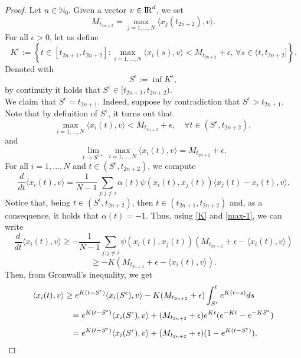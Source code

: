 \documentclass[a4paper,11pt,oneside]{article}
\newcommand{\RR}{{{\rm I} \kern -.15em {\rm R} }}
\begin{document}
	\begin{proof}
		Let $n\in \mathbb{N}_{0}$. Given a vector $v\in \RR^{d}$, we set $$M_{t_{2n+2}}=\max_{j=1,\dots,N}\langle x_{j}(t_{2n+2}),v\rangle.$$
		For all $\epsilon >0$, let us define
		$$K^{\epsilon}:=\left\{t\in [t_{2n+1},t_{2n+2}] :\max_{i=1,\dots,N}\langle x_{i}(s),v\rangle < M_{t_{2n+2}}+\epsilon,\,\forall s\in (t,t_{2n+2}]\right\}.$$
		Denoted with $$S^{\epsilon}:=\inf K^{\epsilon},$$
		by continuity it holds that $S^{\epsilon}\in [t_{2n+1},t_{2n+2})$. \\We claim that $S^{\epsilon}=t_{2n+1}$. Indeed, suppose by contradiction that $S^{\epsilon}>t_{2n+1}$. Note that by definition of $S^{\epsilon}$, it turns out that \begin{equation}\label{max-1}
			\max_{i=1,\dots,N}\langle x_{i}(t),v\rangle<M_{t_{2n+2}}+\epsilon,\quad \forall t\in (S^{\epsilon},t_{2n+2}),
		\end{equation}
		and \begin{equation}\label{teps-1}
			\lim_{t\to S^{\epsilon+}}\max_{i=1,\dots,N}\langle x_{i}(t),v\rangle=M_{t_{2n+2}}+\epsilon.
		\end{equation}
		For all $i=1,\dots,N$ and $t\in (S^{\epsilon},t_{2n+2})$, we compute
		$$\frac{d}{dt}\langle x_{i}(t),v\rangle=\frac{1}{N-1}\sum_{j:j\neq i}\alpha(t)\psi(x_{i}(t), x_{j}(t))\langle x_{j}(t)-x_{i}(t),v\rangle.$$
		Notice that, being $t\in (S^{\epsilon},t_{2n+2})$, then  $t\in (t_{2n+1}, t_{2n+2})$ and, as a consequence, it holds that $\alpha(t)=-1.$ Thus, using \eqref{K} and \eqref{max-1}, we can write $$\frac{d}{dt}\langle x_{i}(t),v\rangle\geq -\frac{1}{N-1}\sum_{j:j\neq i}\psi(x_{i}(t), x_{j}(t))(M_{t_{2n+2}}+\epsilon-\langle x_{i}(t),v\rangle)$$$$\geq -K(M_{t_{2n+2}}+\epsilon-\langle x_{i}(t),v\rangle).$$
		Then, from Gronwall's inequality, we get
		$$\begin{array}{l}
			\vspace{0.2cm}\displaystyle{
				\langle x_{i}(t),v\rangle\geq e^{K(t-S^{\epsilon})}\langle x_{i}(S^{\epsilon}),v\rangle-K(M_{t_{2n+2}}+\epsilon)\int_{S^{\epsilon}}^{t}e^{K(t-s)}ds}\\
			\vspace{0.3cm}\displaystyle{\hspace{1.7 cm}
				=e^{K(t-S^{\epsilon})}\langle x_{i}(S^{\epsilon}),v\rangle+(M_{t_{2n+2}}+\epsilon)e^{Kt}(e^{-Kt}-e^{-KS^{\epsilon}})}\\
			\displaystyle{\hspace{1.7 cm}
				=e^{K(t-S^{\epsilon})}\langle x_{i}(S^{\epsilon}),v\rangle+(M_{t_{2n+2}}+\epsilon)(1-e^{K(t-S^{\epsilon})}),}\\

\end{array}$$
\end{proof}
\end{document}
